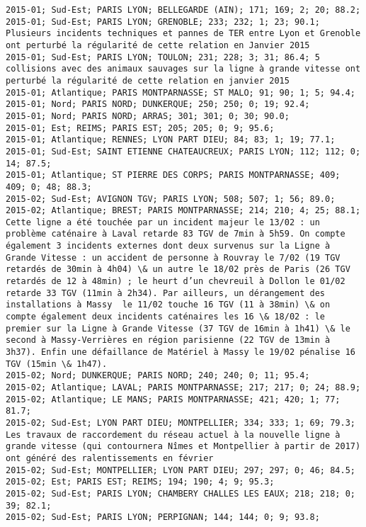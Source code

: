 \documentclass{article}
\begin{document}
\begin{Verbatim}[commandchars=\\\{\}]
2015-01; Sud-Est; PARIS LYON; BELLEGARDE (AIN); 171; 169; 2; 20; 88.2; 
2015-01; Sud-Est; PARIS LYON; GRENOBLE; 233; 232; 1; 23; 90.1; Plusieurs incidents techniques et pannes de TER entre Lyon et Grenoble ont perturbé la régularité de cette relation en Janvier 2015
2015-01; Sud-Est; PARIS LYON; TOULON; 231; 228; 3; 31; 86.4; 5 collisions avec des animaux sauvages sur la ligne à grande vitesse ont perturbé la régularité de cette relation en janvier 2015
2015-01; Atlantique; PARIS MONTPARNASSE; ST MALO; 91; 90; 1; 5; 94.4; 
2015-01; Nord; PARIS NORD; DUNKERQUE; 250; 250; 0; 19; 92.4; 
2015-01; Nord; PARIS NORD; ARRAS; 301; 301; 0; 30; 90.0; 
2015-01; Est; REIMS; PARIS EST; 205; 205; 0; 9; 95.6; 
2015-01; Atlantique; RENNES; LYON PART DIEU; 84; 83; 1; 19; 77.1; 
2015-01; Sud-Est; SAINT ETIENNE CHATEAUCREUX; PARIS LYON; 112; 112; 0; 14; 87.5; 
2015-01; Atlantique; ST PIERRE DES CORPS; PARIS MONTPARNASSE; 409; 409; 0; 48; 88.3; 
2015-02; Sud-Est; AVIGNON TGV; PARIS LYON; 508; 507; 1; 56; 89.0; 
2015-02; Atlantique; BREST; PARIS MONTPARNASSE; 214; 210; 4; 25; 88.1; Cette ligne a été touchée par un incident majeur le 13/02 : un problème caténaire à Laval retarde 83 TGV de 7min à 5h59. On compte également 3 incidents externes dont deux survenus sur la Ligne à Grande Vitesse : un accident de personne à Rouvray le 7/02 (19 TGV retardés de 30min à 4h04) \& un autre le 18/02 près de Paris (26 TGV retardés de 12 à 48min) ; le heurt d’un chevreuil à Dollon le 01/02 retarde 33 TGV (11min à 2h34). Par ailleurs, un dérangement des installations à Massy  le 11/02 touche 16 TGV (11 à 38min) \& on compte également deux incidents caténaires les 16 \& 18/02 : le premier sur la Ligne à Grande Vitesse (37 TGV de 16min à 1h41) \& le second à Massy-Verrières en région parisienne (22 TGV de 13min à 3h37). Enfin une défaillance de Matériel à Massy le 19/02 pénalise 16 TGV (15min \& 1h47).
2015-02; Nord; DUNKERQUE; PARIS NORD; 240; 240; 0; 11; 95.4; 
2015-02; Atlantique; LAVAL; PARIS MONTPARNASSE; 217; 217; 0; 24; 88.9; 
2015-02; Atlantique; LE MANS; PARIS MONTPARNASSE; 421; 420; 1; 77; 81.7; 
2015-02; Sud-Est; LYON PART DIEU; MONTPELLIER; 334; 333; 1; 69; 79.3; Les travaux de raccordement du réseau actuel à la nouvelle ligne à grande vitesse (qui contournera Nîmes et Montpellier à partir de 2017) ont généré des ralentissements en février
2015-02; Sud-Est; MONTPELLIER; LYON PART DIEU; 297; 297; 0; 46; 84.5; 
2015-02; Est; PARIS EST; REIMS; 194; 190; 4; 9; 95.3; 
2015-02; Sud-Est; PARIS LYON; CHAMBERY CHALLES LES EAUX; 218; 218; 0; 39; 82.1; 
2015-02; Sud-Est; PARIS LYON; PERPIGNAN; 144; 144; 0; 9; 93.8; 

\end{Verbatim}
\end{document}
